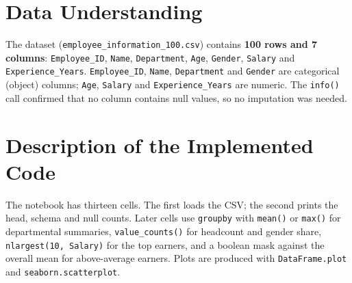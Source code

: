 \documentclass[12pt,a4paper,oneside]{report}
\begin{document}
\section{Data Understanding}
The dataset (\texttt{employee\_information\_100.csv}) contains \textbf{100 rows and 7 columns}: \texttt{Employee\_ID}, \texttt{Name}, \texttt{Department}, \texttt{Age}, \texttt{Gender}, \texttt{Salary} and \texttt{Experience\_Years}. \texttt{Employee\_ID}, \texttt{Name}, \texttt{Department} and \texttt{Gender} are categorical (object) columns; \texttt{Age}, \texttt{Salary} and \texttt{Experience\_Years} are numeric. The \texttt{info()} call confirmed that no column contains null values, so no imputation was needed.


\section{Description of the Implemented Code}
The notebook has thirteen cells. The first loads the CSV; the second prints the head, schema and null counts. Later cells use \texttt{groupby} with \texttt{mean()} or \texttt{max()} for departmental summaries, \texttt{value\_counts()} for headcount and gender share, \texttt{nlargest(10,\ \textquotesingle{}Salary\textquotesingle{})} for the top earners, and a boolean mask against the overall mean for above-average earners. Plots are produced with \texttt{DataFrame.plot} and \texttt{seaborn.scatterplot}.
\end{document}

